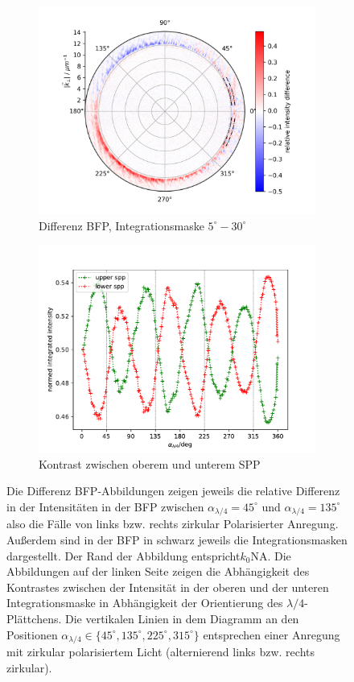 \documentclass[titlepage]{article}
\begin{document}
\begin{figure}
		\begin{subfigure}[b]{0.5\textwidth}
			\centering
			\includegraphics[width=\textwidth]{figures/spin_hall/diff_forw.png}
			\caption{Differenz BFP, Integrationsmaske $5^\circ-30^\circ$}
			\label{fig:diff_front}
		\end{subfigure}
		\hfill
		\begin{subfigure}[b]{0.49\textwidth}
			\centering
			\includegraphics[width=\textwidth]{figures/spin_hall/intensity_forw.pdf}
			\caption{Kontrast zwischen oberem und unterem SPP}
			\label{fig:intensity_front}
		\end{subfigure}
		\caption{Die Differenz BFP-Abbildungen zeigen jeweils die relative Differenz in der Intensitäten in der BFP zwischen $\alpha_{\lambda/4} = 45^\circ$ und  $\alpha_{\lambda/4} = 135^\circ$ also die Fälle von links bzw. rechts zirkular Polarisierter Anregung. Außerdem sind in der BFP in schwarz jeweils die Integrationsmasken dargestellt. Der Rand der Abbildung entspricht$k_0\mathrm{NA}$. Die Abbildungen auf der linken Seite zeigen die Abhängigkeit des Kontrastes zwischen der Intensität in der oberen und der unteren Integrationsmaske in Abhängigkeit der Orientierung des $\lambda/4$-Plättchens. Die vertikalen Linien in dem Diagramm an den Positionen $\alpha_{\lambda/4} \in \{45^\circ, 135^\circ, 225^\circ, 315^\circ\}$ entsprechen einer Anregung mit zirkular polarisiertem Licht (alternierend links bzw. rechts zirkular).}	
	\end{figure}
\end{document}
